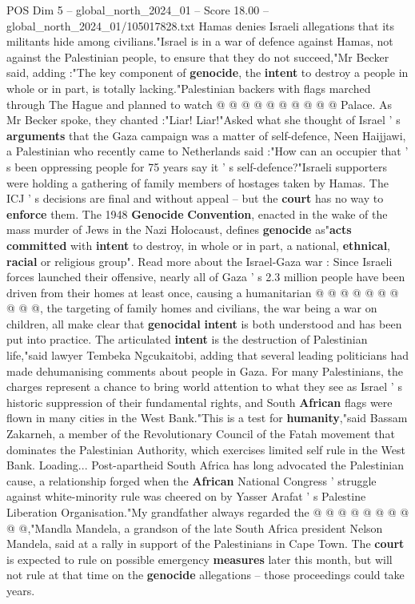 \begin{textsample}{POS Dim 5 – global\_north\_2024\_01 – Score 18.00 – global\_north\_2024\_01/105017828.txt}
Hamas denies Israeli allegations that its militants hide among civilians."Israel is in a war of defence against Hamas, not against the Palestinian people, to ensure that they do not succeed,"Mr Becker said, adding :"The key component of \textbf{genocide}, the \textbf{intent} to destroy a people in whole or in part, is totally lacking."Palestinian backers with flags marched through The Hague and planned to watch @ @ @ @ @ @ @ @ @ @ Palace.
As Mr Becker spoke, they chanted :"Liar!
Liar!"Asked what she thought of Israel ' s \textbf{arguments} that the Gaza campaign was a matter of self-defence, Neen Haijjawi, a Palestinian who recently came to Netherlands said :"How can an occupier that ' s been oppressing people for 75 years say it ' s self-defence?"Israeli supporters were holding a gathering of family members of hostages taken by Hamas.
The ICJ ' s decisions are final and without appeal -- but the \textbf{court} has no way to \textbf{enforce} them.
The 1948 \textbf{Genocide} \textbf{Convention}, enacted in the wake of the mass murder of Jews in the Nazi Holocaust, defines \textbf{genocide} as"\textbf{acts} \textbf{committed} with \textbf{intent} to destroy, in whole or in part, a national, \textbf{ethnical}, \textbf{racial} or religious group".
Read more about the Israel-Gaza war : Since Israeli forces launched their offensive, nearly all of Gaza ' s 2.3 million people have been driven from their homes at least once, causing a humanitarian @ @ @ @ @ @ @ @ @ @, the targeting of family homes and civilians, the war being a war on children, all make clear that \textbf{genocidal} \textbf{intent} is both understood and has been put into practice.
The articulated \textbf{intent} is the destruction of Palestinian life,"said lawyer Tembeka Ngcukaitobi, adding that several leading politicians had made dehumanising comments about people in Gaza.
For many Palestinians, the charges represent a chance to bring world attention to what they see as Israel ' s historic suppression of their fundamental rights, and South \textbf{African} flags were flown in many cities in the West Bank."This is a test for \textbf{humanity},"said Bassam Zakarneh, a member of the Revolutionary Council of the Fatah movement that dominates the Palestinian Authority, which exercises limited self rule in the West Bank.
Loading...
Post-apartheid South Africa has long advocated the Palestinian cause, a relationship forged when the \textbf{African} National Congress ' struggle against white-minority rule was cheered on by Yasser Arafat ' s Palestine Liberation Organisation."My grandfather always regarded the @ @ @ @ @ @ @ @ @ @,"Mandla Mandela, a grandson of the late South Africa president Nelson Mandela, said at a rally in support of the Palestinians in Cape Town.
The \textbf{court} is expected to rule on possible emergency \textbf{measures} later this month, but will not rule at that time on the \textbf{genocide} allegations -- those proceedings could take years.

\end{textsample}
